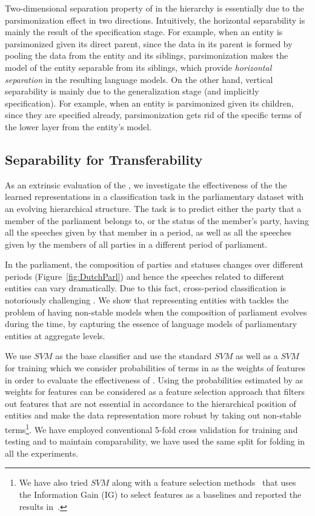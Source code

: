 Two\:-\:dimensional separation property of \achswlm in the hierarchy is essentially due to the parsimonization effect in two directions. 
Intuitively, the horizontal separability is mainly the result of the specification stage. For example, when an entity is parsimonized given its direct parent, since the data in its parent is formed by pooling the data from the entity and its siblings, parsimonization makes the model of the entity separable from its siblings, which provide \emph{horizontal separation} in the resulting language models. On the other hand, vertical separability is mainly due to the generalization stage (and implicitly specification). For example, when an entity is parsimonized given its children, since they are specified already, parsimonization gets rid of the specific terms of the lower layer from the entity's model.


\subsection{Separability for Transferability}
\label{subsec:Separability}
As an extrinsic evaluation of the \hswlms, we investigate the effectiveness of the the learned representations in a classification task in the parliamentary dataset with an evolving hierarchical structure. The task is to predict either the party that a member of the parliament belongs to, or the status of the member's party, having all the speeches given by that member in a period,  as well as all the speeches given by the members of all parties in a different period of parliament.

In the parliament, the composition of parties and statuses changes over different periods (Figure~\ref{fig:DutchParl}) and hence the speeches related to different entities can vary dramatically.  Due to this fact, cross-period classification is notoriously challenging \citep{Hirst:2014,yu:2008}.  We show that representing entities with \achswlm tackles the problem of having non-stable models when the composition of parliament evolves during the time, by capturing the essence of language models of parliamentary entities at aggregate levels. 

We use $SVM$ as the base classifier and use the standard $SVM$ as well as a $SVM$ for training which we consider probabilities of terms in \achswlm as the weights of features in order to evaluate the effectiveness of \achswlm. Using the probabilities estimated by \achswlm as weights for features can be considered as a feature selection approach that filters out features that are not essential in accordance to the hierarchical position of entities and make the data representation more robust by taking out non-stable terms\footnote{We have also tried $SVM$ along with a feature selection methods~\citep{Forman:2003,brank:2002} that uses the Information Gain (IG) to select features as a baselines and reported the results in~\citep{Dehghani:2016:ICTIR}.}.
We have employed conventional 5-fold cross validation for training and testing and to maintain comparability, we have used the same split for folding in all the experiments.

